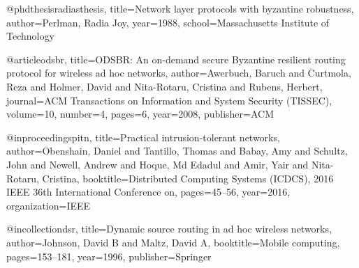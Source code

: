 @phdthesis{radiasthesis,
  title={Network layer protocols with byzantine robustness},
  author={Perlman, Radia Joy},
  year={1988},
  school={Massachusetts Institute of Technology}
}

@article{odsbr,
  title={ODSBR: An on-demand secure Byzantine resilient routing protocol for wireless ad hoc networks},
  author={Awerbuch, Baruch and Curtmola, Reza and Holmer, David and Nita-Rotaru, Cristina and Rubens, Herbert},
  journal={ACM Transactions on Information and System Security (TISSEC)},
  volume={10},
  number={4},
  pages={6},
  year={2008},
  publisher={ACM}
}

@inproceedings{pitn,
  title={Practical intrusion-tolerant networks},
  author={Obenshain, Daniel and Tantillo, Thomas and Babay, Amy and Schultz, John and Newell, Andrew and Hoque, Md Edadul and Amir, Yair and Nita-Rotaru, Cristina},
  booktitle={Distributed Computing Systems (ICDCS), 2016 IEEE 36th International Conference on},
  pages={45--56},
  year={2016},
  organization={IEEE}
}

@incollection{dsr,
  title={Dynamic source routing in ad hoc wireless networks},
  author={Johnson, David B and Maltz, David A},
  booktitle={Mobile computing},
  pages={153--181},
  year={1996},
  publisher={Springer}
}
